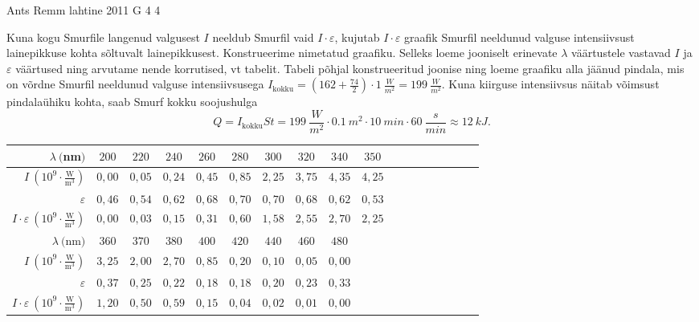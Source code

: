 \documentclass[11pt, twoside]{article}
\begin{document}
{%
{Ants Remm} %
{lahtine} %
{2011} %
{G 4} %
{4} %
{

\ifSolution
Kuna kogu Smurfile langenud valgusest $I$ neeldub Smurfil vaid $ I \cdot
\varepsilon $, kujutab $ I \cdot \varepsilon $ graafik Smurfil neeldunud valguse
intensiivsust lainepikkuse kohta sõltuvalt lainepikkusest. Konstrueerime
nimetatud graafiku. Selleks loeme jooniselt erinevate $ \lambda $ väärtustele
vastavad $ I $ ja $ \varepsilon $ väärtused ning arvutame nende korrutised, vt
tabelit. Tabeli põhjal konstrueeritud joonise ning loeme graafiku alla jäänud
pindala, mis on võrdne Smurfil neeldunud valguse intensiivsusega
$I_{\mathrm{kokku}} =
(162+\frac{74}{2}) \cdot \SI{1}{\frac{W}{m^2}} = \SI{199}{\frac{W}{m^2}}$. Kuna
kiirguse intensiivsus näitab võimsust
pindalaühiku kohta, saab Smurf kokku soojushulga
\[ Q = I_{\mathrm{kokku}}St =
\SI{199}{\frac{W}{m^2}} \cdot \SI{0,1}{m^2} \cdot \SI{10}{min} \cdot
\SI{60}{\frac{s}{min}} \approx \SI{12}{kJ}.\]


\begin{tabular}{r|c|c|c|c|c|c|c|c|c|c|c|c|c|c|c|c|c|}
	\hline
	$ \lambda \ ($nm$)                                               $&$ 200  $&$ 220  $&$ 240  $&$ 260  $&$ 280  $&$ 300  $&$ 320  $&$ 340  $&$ 350  $\\
	\hline
	$ I \ (10^9 \cdot \frac{\text{W}}{\text{m}^3})                   $&$ 0,00 $&$ 0,05 $&$ 0,24 $&$ 0,45 $&$ 0,85 $&$ 2,25 $&$ 3,75 $&$ 4,35 $&$ 4,25 $\\
	\hline
	$ \varepsilon                                                    $&$ 0,46 $&$ 0,54 $&$ 0,62 $&$ 0,68 $&$ 0,70 $&$ 0,70 $&$ 0,68 $&$ 0,62 $&$ 0,53 $\\
	\hline
	$ I \cdot \varepsilon \ (10^9 \cdot \frac{\text{W}}{\text{m}^3}) $&$ 0,00 $&$ 0,03 $&$ 0,15 $&$ 0,31 $&$ 0,60 $&$ 1,58 $&$ 2,55 $&$ 2,70 $&$ 2,25 $\\
	\hline
	\hline
	$ \lambda \ ($nm$)                                               $&$ 360  $&$ 370  $&$ 380  $&$ 400  $&$ 420  $&$ 440  $&$ 460  $&$ 480  $\\
	\hline
	$ I \ (10^9 \cdot \frac{\text{W}}{\text{m}^3})                   $&$ 3,25 $&$ 2,00 $&$ 2,70 $&$ 0,85 $&$ 0,20 $&$ 0,10 $&$ 0,05 $&$ 0,00 $\\
	\hline
	$ \varepsilon                                                    $&$ 0,37 $&$ 0,25 $&$ 0,22 $&$ 0,18 $&$ 0,18 $&$ 0,20 $&$ 0,23 $&$ 0,33 $\\
	\hline
	$ I \cdot \varepsilon \ (10^9 \cdot \frac{\text{W}}{\text{m}^3}) $&$ 1,20 $&$ 0,50 $&$ 0,59 $&$ 0,15 $&$ 0,04 $&$ 0,02 $&$ 0,01 $&$ 0,00 $\\ 	
\end{tabular}

}}
\end{document}
